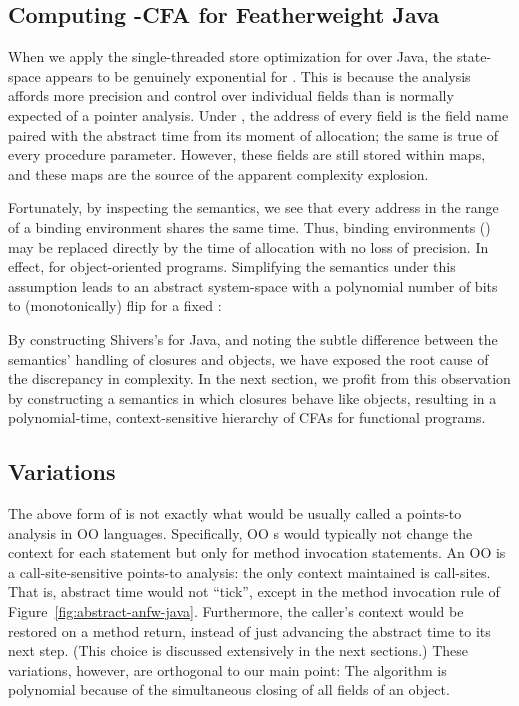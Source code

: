 \subsection{Computing -CFA for Featherweight Java}

When we apply the single-threaded store optimization for \kCFA{} over
Java, the state-space appears to be genuinely exponential for .
This is because the analysis affords more precision and control over
individual fields than is normally expected of a pointer analysis.
Under \kCFA, the address of every field is the field name paired with
the abstract time from its moment of allocation; the same is true of
every procedure parameter.
However, these fields are still stored within maps, and these maps are
the source of the apparent complexity explosion.

Fortunately, by inspecting the semantics, we see that every address
in the range of a binding environment shares the same time.
Thus, binding environments () may be replaced
directly by the time of allocation with no loss of precision.
In effect,  for object-oriented programs.
Simplifying the semantics under this assumption leads to an abstract
system-space with a polynomial number of bits to (monotonically) flip for a fixed :
\begin{small}\end{small}



By constructing Shivers's \kCFA{} for Java, and noting the subtle
difference between the semantics' handling of closures and objects, we
have exposed the root cause of the discrepancy in complexity.
In the next section, we profit from this observation by constructing a
semantics in which closures behave like objects, resulting in a
polynomial-time, context-sensitive hierarchy of CFAs for functional
programs.

\subsection{Variations}

The above form of \kCFA{} is not exactly what would be usually called
a \kCFA{} points-to analysis in OO languages. Specifically, OO
\kCFA{}s would typically not change the context for each statement but
only for method invocation statements. An OO \kCFA{} is a
call-site-sensitive points-to analysis: the only context maintained is
call-sites. That is, abstract time would not ``tick'', except in the
method invocation rule of
Figure~\ref{fig:abstract-anfw-java}. Furthermore, the caller's context
would be restored on a method return, instead of just advancing the
abstract time to its next step. (This choice is discussed extensively
in the next sections.) These variations, however, are orthogonal to
our main point: The algorithm is polynomial because of the
simultaneous closing of all fields of an object.




